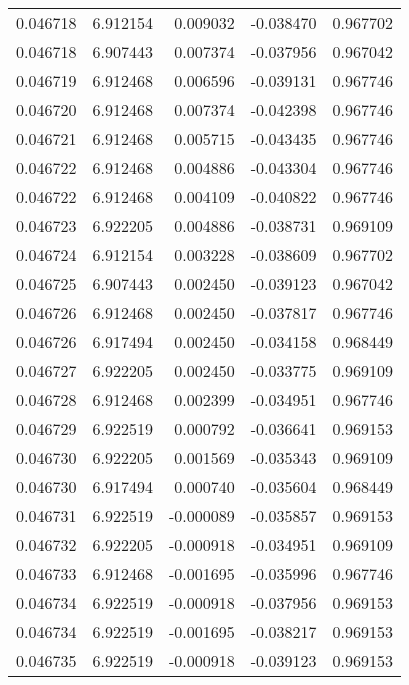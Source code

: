 \begin{tabular}{lrrrr}
0.046718    &  6.912154 &  0.009032 & -0.038470 &             0.967702 \\
0.046718    &  6.907443 &  0.007374 & -0.037956 &             0.967042 \\
0.046719    &  6.912468 &  0.006596 & -0.039131 &             0.967746 \\
0.046720    &  6.912468 &  0.007374 & -0.042398 &             0.967746 \\
0.046721    &  6.912468 &  0.005715 & -0.043435 &             0.967746 \\
0.046722    &  6.912468 &  0.004886 & -0.043304 &             0.967746 \\
0.046722    &  6.912468 &  0.004109 & -0.040822 &             0.967746 \\
0.046723    &  6.922205 &  0.004886 & -0.038731 &             0.969109 \\
0.046724    &  6.912154 &  0.003228 & -0.038609 &             0.967702 \\
0.046725    &  6.907443 &  0.002450 & -0.039123 &             0.967042 \\
0.046726    &  6.912468 &  0.002450 & -0.037817 &             0.967746 \\
0.046726    &  6.917494 &  0.002450 & -0.034158 &             0.968449 \\
0.046727    &  6.922205 &  0.002450 & -0.033775 &             0.969109 \\
0.046728    &  6.912468 &  0.002399 & -0.034951 &             0.967746 \\
0.046729    &  6.922519 &  0.000792 & -0.036641 &             0.969153 \\
0.046730    &  6.922205 &  0.001569 & -0.035343 &             0.969109 \\
0.046730    &  6.917494 &  0.000740 & -0.035604 &             0.968449 \\
0.046731    &  6.922519 & -0.000089 & -0.035857 &             0.969153 \\
0.046732    &  6.922205 & -0.000918 & -0.034951 &             0.969109 \\
0.046733    &  6.912468 & -0.001695 & -0.035996 &             0.967746 \\
0.046734    &  6.922519 & -0.000918 & -0.037956 &             0.969153 \\
0.046734    &  6.922519 & -0.001695 & -0.038217 &             0.969153 \\
0.046735    &  6.922519 & -0.000918 & -0.039123 &             0.969153 \\

\end{tabular}
